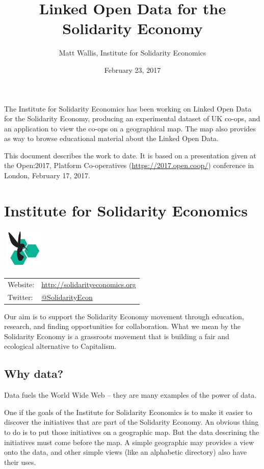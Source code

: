 \documentclass[11pt,twoside,a4paper]{article}
\title{Linked Open Data for the Solidarity Economy}
\author{Matt Wallis, Institute for Solidarity Economics}
\date{February 23, 2017}
\begin{document}
\maketitle

The Institute for Solidarity Economics has been working on Linked Open Data for the Solidarity Economy,
producing an experimental dataset of UK co-ops, and an application to view the co-ops on a geographical map.
The map also provides as way to browse educational material about the Linked Open Data.

This document describes the work to date.
It is based on a presentation given at the Open:2017,
Platform Co-operatives (\url{https://2017.open.coop/}) conference in London, February 17, 2017.

\section*{Institute for Solidarity Economics}
  \begin{center}
    \includegraphics[height=2cm,width=2cm]{ise-logo.jpg}

    \begin{tabular}{l l}
      Website: & \url{http://solidarityeconomics.org} \\
      Twitter: & \href{https://twitter.com/SolidarityEcon}{@SolidarityEcon} \\
    \end{tabular}
  \end{center}

Our aim is to support the Solidarity Economy movement through education, research, and finding opportunities for collaboration.
What we mean by the Solidarity Economy is a grassroots movement that is building a fair and ecological alternative to Capitalism.

\subsection*{Why data?}
Data fuels the World Wide Web -- they are many examples of the power of data. 

One if the goals of the Institute for Solidarity Economics is to make it easier to discover the initiatives that are part of the Solidarity Economy.
An obvious thing to do is to put those initiatives on a geographic map.
But the data descrining the initiatives must come before the map. A simple geographic may provides a view onto the data, and other simple views (like an alphabetic directory) also have their uses.
\end{document}

